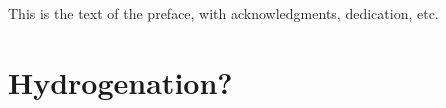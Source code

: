 \documentclass[hidelinks,phd,final]{pittetd}
\begin{document}
\maketitle
\makecommittee
\copyrightpage                     
\begin{abstract}
The abstract of the document.
This document is a sample file for the creation of ETD's at Pitt through \LaTeX.
\end{abstract}

\tableofcontents
\listoftables                      
\listoffigures                
\preface
This is the text of the preface, with acknowledgments, dedication, etc. 
%
%







\appendix     


\chapter{Hydrogenation?}
\printbibliography
\end{document}
